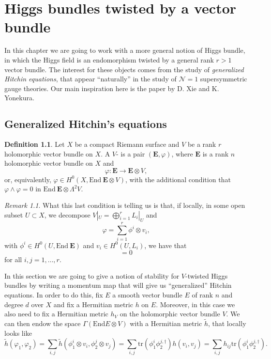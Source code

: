 \documentclass[12pt,a4paper]{book}
\theoremstyle{definition} \newtheorem{defn}[thm]{Definition}
\theoremstyle{definition} \newtheorem{ejemplo}[thm]{Example}
\theoremstyle{remark} \newtheorem{rem}[thm]{Remark}
\def\tr{\mathrm{tr}}
\def\End{\mathrm{End}}
\newcommand{\ve}[1]{\mathbf{#1}}
\let\emph\relax
\begin{document}
    \chapter{Higgs bundles twisted by a vector bundle}
    In this chapter we are going to work with a more general notion of Higgs bundle, in which the Higgs field is an endomorphism twisted by a general rank $r>1$ vector bundle. The interest for these objects comes from the study of \textit{generalized Hitchin equations}, that appear ``naturally'' in the study of $\mathcal{N}=1$ supersymmetric gauge theories. Our main inspiration here is the paper \cite{xieyonekura} by D. Xie and K. Yonekura.

    \section{Generalized Hitchin's equations}

    \begin{defn}
      Let $X$ be a compact Riemann surface and $V$ be a rank $r$ holomorphic vector bundle on $X$. A $V$-\emph{twisted Higgs bundle} is a pair $(\ve{E},\varphi)$, where $\ve{E}$ is a rank $n$ holomorphic vector bundle on $X$ and
      \begin{equation*}
	\varphi: \ve{E} \longrightarrow \ve{E} \otimes V,
      \end{equation*}
      or, equivalently, $\varphi \in H^0(X,\End\ \ve{E} \otimes V)$, with the additional condition that 
      $	\varphi \wedge \varphi =0$ in $\End\ \ve{E} \otimes \Lambda^2 V$.
    \end{defn}

    \begin{rem}
      What this last condition is telling us is that, if locally, in some open subset $U\subset X$, we decompose $V|_U=\bigoplus_{i=1}^r L_i|_U$ and 
      \begin{equation*}
	\varphi= \sum_{i=1}^r \phi^i \otimes v_i,
      \end{equation*}
      with $\phi^i \in H^0(U,\End\ \ve{E})$ and $v_i \in H^0(U,L_i)$, we have that
      \begin{equation*}
	[\phi^i,\phi^j]=0
      \end{equation*}
      for all $i,j=1,\dots,r$.
    \end{rem}

    In this section we are going to give a notion of stability for $V$-twisted Higgs bundles by writing a momentum map that will give us ``generalized'' Hitchin equations. In order to do this, fix $E$ a smooth vector bundle $E$ of rank $n$ and degree $d$ over $X$ and fix a Hermitian metric $h$ on $E$. Moreover, in this case we also need to fix a Hermitian metric $h_V$ on the holomorphic vector bundle $V$. We can then endow the space $\Gamma(\End E \otimes V)$ with a Hermitian metric $\tilde{h}$, that locally looks like
    \begin{equation*}
      \tilde{h}(\varphi_1,\varphi_2)=\sum_{i,j} \tilde{h}(\phi_1^i\otimes v_i,\phi_2^j\otimes v_j)=\sum_{i,j} \tr(\phi_1^i\phi_2^{j,\dagger}) h(v_i,v_j)=\sum_{i,j}h_{ij} \tr(\phi_1^i\phi_2^{j,\dagger}).
    \end{equation*}
\end{document}
